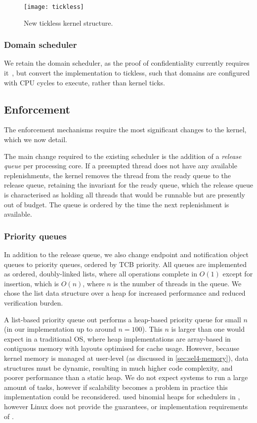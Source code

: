 \begin{figure}
    \centering 
    \texttt{[image: tickless]}
    \caption{New tickless kernel structure.}
    \label{figure:tickless}
\end{figure}

\subsubsection{Domain scheduler}

We retain the domain scheduler, as the proof of confidentiality currently requires
it~\citep{Murray_MBGBSLGK_13}, but convert the implementation to tickless, such that domains are
configured with CPU cycles to execute, rather than kernel ticks.

\subsection{Enforcement}

The enforcement mechanisms require the most significant changes to the kernel, which we now detail.

The main change required to the existing scheduler is the addition of a \emph{release queue} per
processing core. If a
preempted thread does not have any available replenishments, the kernel removes the thread from the
ready queue to the release queue, retaining the invariant for the ready queue, which the release
queue is characterised as holding all threads that would be runnable but are presently out of
budget. The queue is ordered by the time the next replenishment is available.

\subsubsection{Priority queues}

In addition to the release queue, we also change endpoint and notification object queues
to priority queues, ordered by \gls{TCB} priority. All queues are implemented as ordered, doubly-linked
lists, where all operations complete in $O(1)$ except for insertion, which is $O(n)$, where $n$ 
is the number of threads in the queue. 
We chose the list data structure over a heap for increased performance and reduced verification
burden.

A list-based priority queue out performs a heap-based priority queue for small $n$ (in our
implementation up to around $n = 100$).  This $n$ is larger than one would expect in a traditional
\gls{OS}, where heap implementations are array-based in contiguous memory with layouts optimised for
cache usage.  However, because \selfour kernel memory is
managed at user-level (as discussed in \cref{sec:sel4-memory}), data structures must be dynamic, 
resulting in much higher code complexity, and poorer performance than a static heap. 
We do not expect systems to run a large amount of tasks, however if scalability becomes a problem in
practice this implementation could be reconsidered. \citet{Brandenburg:phd} used
binomial heaps for schedulers in \litmus, however Linux does not provide the guarantees, or
implementation requirements of \selfour.

